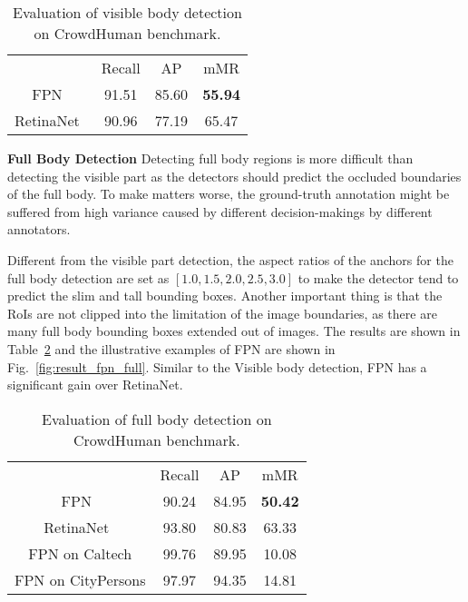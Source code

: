 \documentclass[10pt,twocolumn,letterpaper]{article}
\newcommand{\myparagraph}[1]{{\vspace{0.5em} \noindent \bf #1}}
\begin{document}
\setlength{\tabcolsep}{4pt}
\begin{table}
\begin{center}
\caption{Evaluation of visible body detection on CrowdHuman benchmark.}
\label{table:evalvis}
\begin{tabular}{cccc}
\hline\noalign{\smallskip}
{} & Recall & AP & mMR\\
\noalign{\smallskip}
\hline
\noalign{\smallskip}
FPN~\cite{lin2017feature}  & {91.51} & {85.60} & {\textbf{55.94}}\\
RetinaNet~\cite{lin2017focal} & {90.96} & {77.19} & {65.47}\\
\hline
\end{tabular}
\end{center}
\end{table}
\setlength{\tabcolsep}{1.4pt}


\myparagraph{Full Body Detection} %
Detecting full body regions is more difficult than detecting the visible part as the detectors should predict the occluded boundaries of the full body. To make matters worse, the ground-truth annotation might be suffered from high variance caused by different decision-makings by different annotators.

Different from the visible part detection, the aspect ratios of the anchors for the full body detection are set as $[1.0, 1.5, 2.0, 2.5, 3.0]$ to make the detector tend to predict the slim and tall bounding boxes. Another important thing is that the RoIs are not clipped into the limitation of the image boundaries, as there are many full body bounding boxes extended out of images. The results are shown in Table~\ref{table:evalfull} and the illustrative examples of FPN are shown in Fig.~\ref{fig:result_fpn_full}. Similar to the Visible body detection, FPN has a significant gain over RetinaNet. 


\setlength{\tabcolsep}{4pt}
\begin{table}
\begin{center}
\caption{Evaluation of full body detection on CrowdHuman benchmark.}
\label{table:evalfull}
\begin{tabular}{cccc}
\hline\noalign{\smallskip}
{} & Recall & AP & mMR\\
\noalign{\smallskip}
\hline
\noalign{\smallskip}
FPN~\cite{lin2017feature} & {90.24} & {84.95} & {\textbf{50.42}}\\
RetinaNet~\cite{lin2017focal} & {93.80} & {80.83} & {63.33}\\
\hline
\hline
FPN on Caltech & {99.76}  & {89.95} & {10.08}\\
FPN on CityPersons & {97.97} & {94.35} & {14.81}\\
\hline
\end{tabular}
\end{center}
\end{table}
\setlength{\tabcolsep}{1.4pt}
\end{document}
